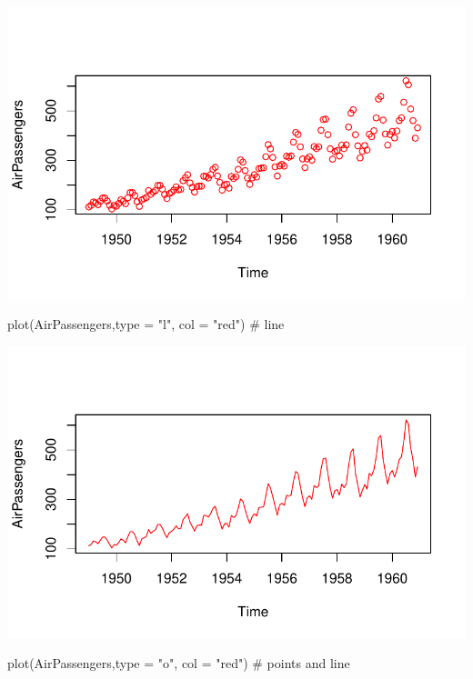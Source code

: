\documentclass[
  letterpaper,
  DIV=11,
  numbers=noendperiod]{scrreprt}
\newenvironment{Shaded}{\begin{snugshade}}{\end{snugshade}}
\newcommand{\AttributeTok}[1]{\textcolor[rgb]{0.40,0.45,0.13}{#1}}
\newcommand{\CommentTok}[1]{\textcolor[rgb]{0.37,0.37,0.37}{#1}}
\newcommand{\FunctionTok}[1]{\textcolor[rgb]{0.28,0.35,0.67}{#1}}
\newcommand{\NormalTok}[1]{\textcolor[rgb]{0.00,0.23,0.31}{#1}}
\newcommand{\StringTok}[1]{\textcolor[rgb]{0.13,0.47,0.30}{#1}}
\begin{document}
\includegraphics{data_analysis_files/figure-pdf/unnamed-chunk-5-1.pdf}

\begin{Shaded}
\begin{Highlighting}[]
\FunctionTok{plot}\NormalTok{(AirPassengers,}\AttributeTok{type =} \StringTok{"l"}\NormalTok{, }\AttributeTok{col =} \StringTok{"red"}\NormalTok{) }\CommentTok{\# line}
\end{Highlighting}
\end{Shaded}

\includegraphics{data_analysis_files/figure-pdf/unnamed-chunk-5-2.pdf}

\begin{Shaded}
\begin{Highlighting}[]
\FunctionTok{plot}\NormalTok{(AirPassengers,}\AttributeTok{type =} \StringTok{"o"}\NormalTok{, }\AttributeTok{col =} \StringTok{"red"}\NormalTok{) }\CommentTok{\# points and line}
\end{Highlighting}
\end{Shaded}
\end{document}
